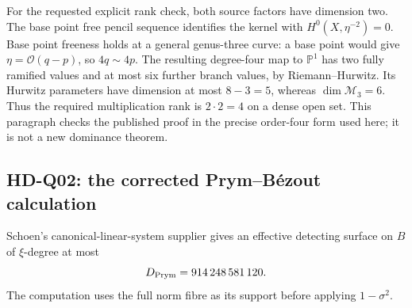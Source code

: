 For the requested explicit rank check, both source factors have dimension two. The base point free pencil sequence identifies the kernel with $H^0(X,\eta^{-2})=0$. Base point freeness holds at a general genus-three curve: a base point would give $\eta=\mathcal O(q-p)$, so $4q\sim4p$. The resulting degree-four map to $\mathbb P^1$ has two fully ramified values and at most six further branch values, by Riemann--Hurwitz. Its Hurwitz parameters have dimension at most $8-3=5$, whereas $\dim\mathcal M_3=6$. Thus the required multiplication rank is $2\cdot2=4$ on a dense open set. This paragraph checks the published proof in the precise order-four form used here; it is not a new dominance theorem.

\subsection{HD-Q02: the corrected Prym--B\'ezout calculation}
Schoen's canonical-linear-system supplier gives an effective detecting surface on $B$ of $\xi$-degree at most
\begin{equation}\label{eq:gaussian-prym-bound}
 D_{\rm Prym}=914\,248\,581\,120.
\end{equation}
The computation uses the full norm fibre as its support before applying $1-\sigma^2$.

